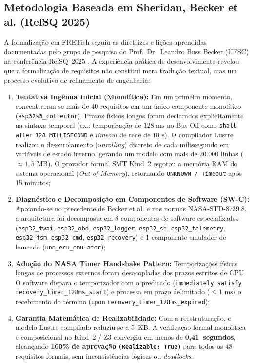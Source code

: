 \subsection{Metodologia Baseada em Sheridan, Becker et al. (RefSQ 2025)}
A formalização em FRETish seguiu as diretrizes e lições aprendidas documentadas pelo grupo de pesquisa do Prof.~Dr.~Leandro Buss Becker (UFSC) na conferência RefSQ~2025 \cite{sheridan2025}. A experiência prática de desenvolvimento revelou que a formalização de requisitos não constitui mera tradução textual, mas um processo evolutivo de refinamento de engenharia:
\begin{enumerate}
    \item \textbf{Tentativa Ingênua Inicial (Monolítica):} Em um primeiro momento, concentraram-se mais de 40 requisitos em um único componente monolítico (\texttt{esp32s3\_collector}). Prazos físicos longos foram declarados explicitamente na sintaxe temporal (ex.: temporização de $128\text{ ms}$ no Bus-Off como \texttt{shall after} \allowbreak \texttt{128 MILLISECOND} e \textit{timeout} de rede de $10\text{ s}$). O compilador Lustre realizou o desenrolamento (\textit{unrolling}) discreto de cada milissegundo em variáveis de estado interno, gerando um modelo com mais de 20.000 linhas ($\approx 1{,}5\text{ MB}$). O provador formal SMT Kind~2 esgotou a memória RAM do sistema operacional (\textit{Out-of-Memory}), retornando \texttt{UNKNOWN / Timeout} após 15 minutos;
    \item \textbf{Diagnóstico e Decomposição em Componentes de Software (SW-C):} Apoiando-se no precedente de Becker et al. \cite{sheridan2025} e nas normas NASA-STD-8739.8, a arquitetura foi decomposta em 8 componentes de software especializados (\texttt{esp32\_twai}, \texttt{esp32\_obd}, \texttt{esp32\_logger}, \texttt{esp32\_sd}, \allowbreak \texttt{esp32\_telemetry}, \texttt{esp32\_fsm}, \texttt{esp32\_cmd}, \texttt{esp32\_recovery}) e 1 componente emulador de bancada (\texttt{uno\_ecu\_emulator});
    \item \textbf{Adoção do NASA Timer Handshake Pattern:} Temporizações físicas longas de processos externos foram desacopladas dos prazos estritos de CPU. O software dispara o temporizador com o predicado (\texttt{immediately satisfy} \allowbreak \texttt{recovery\_timer\_128ms\_start}) e processa em prazo delimitado ($\le 1\text{ ms}$) o recebimento do término (\texttt{upon} \allowbreak \texttt{recovery\_timer\_128ms\_expired});
    \item \textbf{Garantia Matemática de Realizabilidade:} Com a reestruturação, o modelo Lustre compilado reduziu-se a 5~KB. A verificação formal monolítica e composicional no Kind~2 / Z3 convergiu em menos de \textbf{0{,}41~segundos}, alcançando \textbf{100\% de aprovação (\texttt{Realizable: True})} para todos os 48 requisitos formais, sem inconsistências lógicas ou \textit{deadlocks}.
\end{enumerate}

